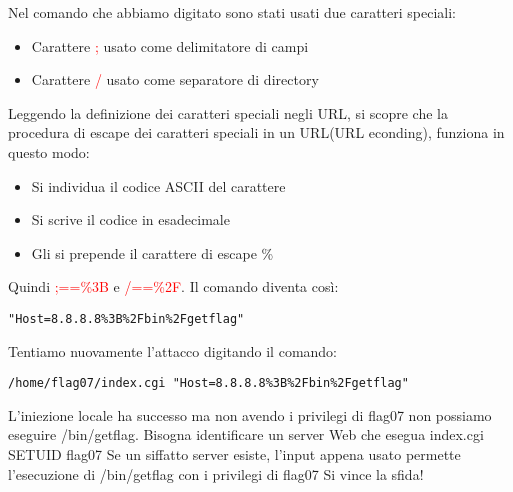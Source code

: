 Nel comando che abbiamo digitato sono stati usati due caratteri speciali:
\begin{itemize}
    \item Carattere \textcolor{red}{;} usato come delimitatore di campi
    \item Carattere \textcolor{red}{/} usato come separatore di directory
\end{itemize}
Leggendo la definizione dei caratteri speciali negli URL, si scopre che la procedura di escape dei caratteri speciali in un URL(URL econding), funziona in questo modo:
\begin{itemize}
    \item Si individua il codice ASCII del carattere
    \item Si scrive il codice in esadecimale
    \item Gli si prepende il carattere di escape \%
\end{itemize}
Quindi \textcolor{red}{;==\%3B} e \textcolor{red}{/==\%2F}. Il comando diventa così:
\begin{lstlisting}[style=bashstyle]
    "Host=8.8.8.8%3B%2Fbin%2Fgetflag"
\end{lstlisting}
Tentiamo nuovamente l’attacco digitando il comando:
\begin{lstlisting}[style=bashstyle]
    /home/flag07/index.cgi "Host=8.8.8.8%3B%2Fbin%2Fgetflag"
\end{lstlisting}
L'iniezione locale ha successo ma non avendo i privilegi di flag07 non possiamo eseguire /bin/getflag.
Bisogna identificare un server Web che esegua index.cgi SETUID flag07 
Se un siffatto server esiste, l'input appena usato permette l'esecuzione di /bin/getflag con i privilegi di flag07 
Si vince la sfida!

